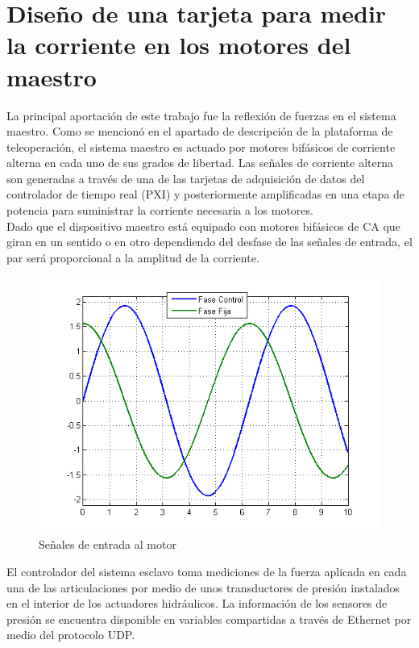 \section{Diseño de una tarjeta para medir la corriente en los motores del maestro }

La principal aportación de este trabajo fue la reflexión de fuerzas en el sistema maestro. Como se mencion\'o en el apartado de descripción de la plataforma de teleoperación, el sistema maestro es actuado por motores bifásicos de corriente alterna en cada uno de sus grados de libertad. Las señales de corriente alterna son generadas a través de una de las tarjetas de adquisición de datos del controlador de tiempo real (PXI) y posteriormente amplificadas en una etapa de potencia para suministrar la corriente necesaria a los motores.\\


Dado que el dispositivo maestro está equipado con motores bifásicos de CA que giran en un sentido o en otro dependiendo del desfase de las señales de entrada, el par ser\'a proporcional a la amplitud de la corriente.\\

\begin{figure}[ht!]
\centering
\includegraphics[scale=0.5]{FiguresP/entradaMotores}
\caption{Señales de entrada al motor}
\label{senalesmotor}
\end{figure}


El controlador del sistema esclavo toma mediciones de la fuerza aplicada en cada una de las articulaciones por medio de unos transductores de presión instalados en el interior de los actuadores hidráulicos. La información de los sensores de   presión se encuentra disponible en variables compartidas a través de Ethernet por medio del protocolo UDP.\\



